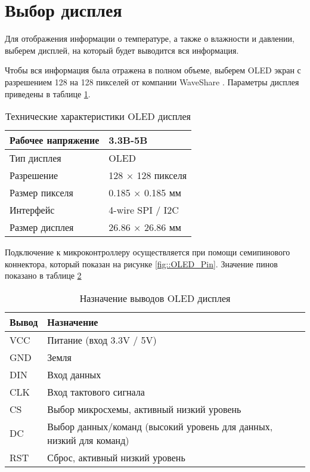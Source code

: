 \section {Выбор дисплея}

Для отображения информации о температуре, а также о влажности и давлении, выберем дисплей, на который будет выводится вся информация. 

Чтобы вся информация была отражена в полном объеме, выберем OLED экран с разрешением 128 на 128 пикселей от компании WaveShare \cite{datasheet::Display}. Параметры дисплея приведены в таблице \ref{tab::specifications}.

\begin{table}[h!]
	\centering
	\caption{Технические характеристики OLED дисплея}
	\begin{tabular}{| m{7cm} | m{7cm} |}
		\hline
		Рабочее напряжение & 3.3B-5B \\ \hline
		Тип дисплея & OLED \\ \hline
		Разрешение & 128 × 128 пикселя \\ \hline
		Размер пикселя & 0.185 × 0.185 мм \\ \hline
		Интерфейс & 4-wire SPI / I2C \\ \hline
		Размер дисплея & 26.86 × 26.86 мм \\ \hline
	\end{tabular}
	
	\label{tab::specifications}
\end{table}

Подключение к микроконтроллеру осуществляется при помощи семипинового коннектора, который показан на рисунке \ref{fig::OLED_Pin}. Значение пинов показано в таблице \ref{tab::pinout}


\begin{table}[htb]
	\centering
	\caption{Назначение выводов OLED дисплея}
	\begin{tabular}{| m{2cm} | m{10cm} |}
		\hline
		\textbf{Вывод} & \textbf{Назначение} \\ \hline
		VCC & Питание (вход 3.3V / 5V) \\ \hline
		GND & Земля \\ \hline
		DIN & Вход данных \\ \hline
		CLK & Вход тактового сигнала \\ \hline
		CS & Выбор микросхемы, активный низкий уровень \\ \hline
		DC & Выбор данных/команд (высокий уровень для данных, низкий для команд) \\ \hline
		RST & Сброс, активный низкий уровень \\ \hline
		\end{tabular}
	\label{tab::pinout}
\end{table}

